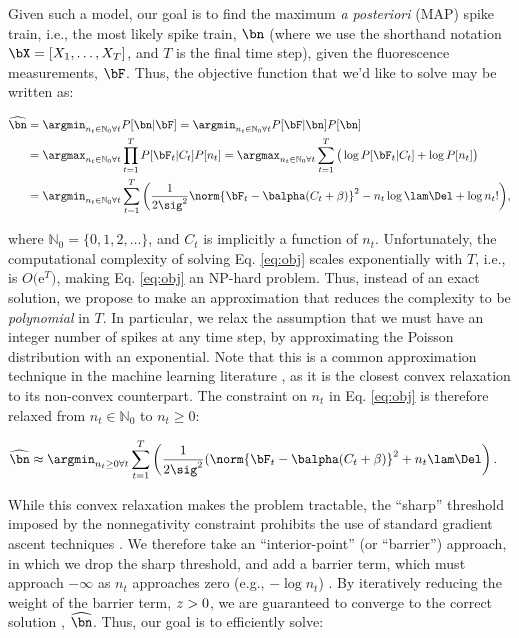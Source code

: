 Given such a model, our goal is to find the maximum \emph{a posteriori} (MAP) spike train, i.e., the most likely spike train, $\bn$ (where we use the shorthand notation $\bX=[X_1, \ldots, X_T]$, and $T$ is the final time step),  given the fluorescence measurements, $\bF$. %
Thus, the objective function that we'd like to solve may be written as:

\begin{align}
\hnm &=  \ann P[\bn | \bF] = \ann P[\bF | \bn] P[\bn] \nonumber  \\
&= \argmax_{n_t \in \mathbb{N}_0 \forall t} \prod_{t=1}^T  P[\bF_t | C_t]  P[n_t] = \argmax_{n_t \in \mathbb{N}_0 \forall t} \sum_{t=1}^T \big( \log P[\bF_t | C_t] + \log P[n_t]\big)  \nonumber \\
&= \ann  \sum_{t=1}^T \bigg( \frac{1}{2 \sig^2}\norm{\bF_t - \balpha(C_t + \beta)}^2  -  n_t \log \lam \Del + \log n_t! \bigg),   \label{eq:obj}
\end{align}

\noindent where $\mathbb{N}_0 = \{0, 1, 2, \ldots\}$, and $C_t$ is implicitly a function of $n_t$.  Unfortunately, the computational complexity of solving Eq. \eqref{eq:obj} scales exponentially with $T$, i.e., is $O($e$^T)$, making Eq. \eqref{eq:obj} an NP-hard problem.  Thus, instead of an exact solution, we propose to make an approximation that reduces the complexity to be \emph{polynomial} in $T$.  In particular, we relax the assumption that we must have an integer number of spikes at any time step, by approximating the Poisson distribution with an exponential.  Note that this is a common approximation technique in the machine learning literature \cite{HastieFriedman01}, as it is the closest convex relaxation to its non-convex counterpart.  The constraint on $n_t$ in Eq. \eqref{eq:obj} is therefore relaxed from  $n_t \in \mathbb{N}_0$ to $n_t \geq 0$:

\begin{align} \label{eq:obj2}
\hnm &\approx \an  \sum_{t=1}^T \left( \frac{1}{2 \sig^2}(\norm{\bF_t -\balpha (C_t + \beta)}^2  +  n_t  \lam \Del \right).
\end{align}

While this convex relaxation makes the problem tractable, the ``sharp'' threshold imposed by the nonnegativity constraint prohibits the use of standard gradient ascent techniques \cite{CONV04}. We therefore take an ``interior-point'' (or ``barrier'') approach, in which we drop the sharp threshold, and add a barrier term, which must approach $-\infty$ as $n_t$ approaches zero (e.g., $-\log n_t$) \cite{CONV04}.  By iteratively reducing the weight of the barrier term, $z > 0$, we are guaranteed to converge to the correct solution \cite{CONV04}, $\hnm$.  Thus, our goal is to efficiently solve:

